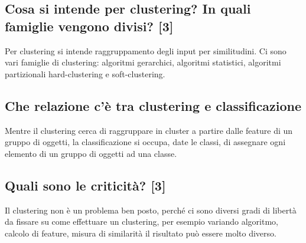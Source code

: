 \documentclass[\main/main.tex]{subfiles}
\begin{document}
\subsection{Cosa si intende per clustering? In quali famiglie vengono divisi? [3]}
Per clustering si intende raggruppamento degli input per similitudini. Ci sono vari famiglie di clustering: algoritmi gerarchici, algoritmi statistici, algoritmi partizionali hard-clustering e soft-clustering.

\subsection{Che relazione c'è tra clustering e classificazione}
Mentre il clustering cerca di raggruppare in cluster a partire dalle feature di un gruppo di oggetti, la classificazione si occupa, date le classi, di assegnare ogni elemento di un gruppo di oggetti ad una classe.

\subsection{Quali sono le criticità? [3]}
Il clustering non è un problema ben posto, perché ci sono diversi gradi di libertà da fissare su come effettuare un clustering, per esempio variando algoritmo, calcolo di feature, misura di similarità il risultato può essere molto diverso. 
\end{document}
